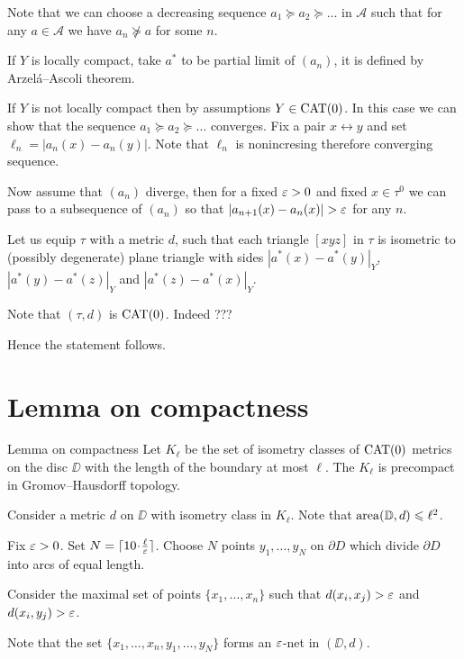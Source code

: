 \documentclass[a4paper,10pt]{amsart}
\begin{document}
Note that we can choose a decreasing sequence 
$a_1
\succcurlyeq
a_2
\succcurlyeq
\dots $
in $\mathcal{A}$ such that for any $a\in \mathcal{A}$
we have $a_n\not\succcurlyeq a$ for some $n$.

If $Y$ is locally compact, 
take $a^*$ to be partial limit of $(a_n)$,
it is defined by Arzel\'a--Ascoli theorem.

If $Y$ is not locally compact then by assumptions $Y\in\mathop{\rm CAT}\nolimits(0)$.
In this case we can show that the sequence $a_1\succcurlyeq a_2\succcurlyeq\dots $ converges.
Fix a pair $x\leftrightarrow y$ and set $\ell_n=|a_n(x)-a_n(y)|$.
Note that $\ell_n$ is nonincresing therefore converging sequence.

Now assume that $(a_n)$ diverge,
then for a fixed $\varepsilon>0$ and fixed  $x\in\tau^{0}$
we can pass to a subsequence of $(a_n)$ so that
$|a_{n+1}(x)-a_{n}(x)|>\eps$ for any $n$.

Let us equip $\tau$ with a metric $d$,
such that each triangle $[xyz]$ in $\tau$ is isometric to (possibly degenerate) plane triangle with sides $|a^*(x)-a^*(y)|_Y$,
$|a^*(y)-a^*(z)|_Y$ and  $|a^*(z)-a^*(x)|_Y$.

Note that $(\tau,d)$ is $\mathop{\rm CAT}\nolimits(0)$.
Indeed ???

Hence the statement follows.
\qeds



\section{Lemma on compactness}

\begin{thm}{Lemma on compactness}\label{lem:compact}
Let $K_\ell$ be the set of isometry classes of $\mathop{\rm CAT}\nolimits(0)$ metrics on the disc $\DD$ with the length of the boundary at most $\ell$.
The $K_\ell$ is precompact in Gromov--Hausdorff topology.
\end{thm}

Consider a metric $d$ on $\DD$ with isometry class in $K_\ell$.
Note that $\mathop{\rm area}\nolimits (\mathbb{D},d)\leqslant \ell^2$.

Fix $\varepsilon>0$. 
Set $N=\lceil 10\cdot\tfrac\ell\eps\rceil$.
Choose $N$ points $y_1,\dots,y_N$ on $\partial D$
which divide $\partial D$ into arcs of equal length.

Consider the maximal set of points $\{x_1,\dots,x_n\}$ such that $d(x_i,x_j)>\varepsilon$ and $d(x_i,y_j)>\varepsilon$.

Note that the set $\{x_1,\dots,x_n,y_1,\dots,y_N\}$
forms an $\varepsilon$-net in $(\DD,d)$.
\end{document}

